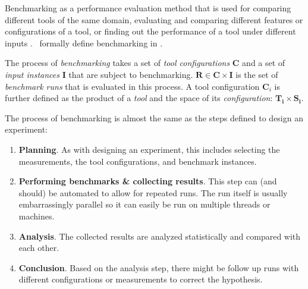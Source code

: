 
Benchmarking as a performance evaluation method that is used for comparing different tools of the same domain, evaluating and comparing different features or configurations of a tool, or finding out the performance of a tool under different inputs \citep{beyerReliableBenchmarkingRequirements2019}.
\First~formally define benchmarking in .

\begin{mydef}[Benchmarking]
	\label{def:benchmarking}
	The process of \emph{benchmarking} takes a set of \emph{tool configurations} $\bm{C}$ and a set of \emph{input instances} $\bm{I}$ that are subject to benchmarking.
	$\bm{R} \in \bm{C} \times \bm{I}$ is the set of \emph{benchmark runs} that is evaluated in this process.
	A tool configuration $\bm{C}_i$ is further defined as the product of a \emph{tool} and the space of its \emph{configuration}: $\bm{T_i} \times \bm{S_i}$.
\end{mydef}

The process of benchmarking is almost the same as the steps \citet{montgomeryDesignAnalysisExperiments2013} defined to design an experiment:
\begin{enumerate}
	\item \textbf{Planning}. As with designing an experiment, this includes selecting the measurements, the tool configurations, and benchmark instances.
	\item \textbf{Performing benchmarks \& collecting results}. This step can (and should) be automated to allow for repeated runs. The run itself is usually embarrassingly parallel so it can easily be run on multiple threads or machines.
	\item \textbf{Analysis}. The collected results are analyzed statistically and compared with each other.
	\item \textbf{Conclusion}. Based on the analysis step, there might be follow up runs with different configurations or measurements to correct the hypothesis.
\end{enumerate}

